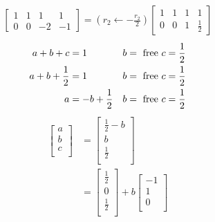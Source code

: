 \documentclass[
	date={August 26{,} 2024}
]{math486notes}
\begin{document}
\begin{example}
\begin{equation*}
	\end{equation*}
	\begin{equation*}
	\begin{aligned}
		\left[ \begin{array}{rrr|r}
			1 & 1 & 1 & 1\\
			0 & 0 & -2 & -1
		\end{array} \right] = \left( r_{2} \gets -\frac{r_{2}}{2} \right)
		\left[ \begin{array}{rrr|r}
			1 & 1 & 1 & 1\\
			0 & 0 & 1 & \frac{1}{2}
		\end{array} \right]
	\end{aligned}
	\end{equation*}
	\begin{equation*}
	\begin{aligned}
		a + b + c &= 1 { }{ } & { }{ } b = \mbox{ free } { }{ } & { }{ } c = \frac{1}{2}\\
		a + b + \frac{1}{2} &= 1 { }{ } & { }{ } b = \mbox{ free } { }{ } & { }{ } c = \frac{1}{2}\\
		a &= -b + \frac{1}{2} { }{ } & { }{ } b = \mbox{ free } { }{ } & { }{ } c = \frac{1}{2}\\
	\end{aligned}
	\end{equation*}\begin{equation*}
	\begin{aligned}
		\left[ \begin{array}{c}
			a\\
			b\\
			c\\
		\end{array} \right]
		&= \left[ \begin{array}{c}
			\frac{1}{2} - b\\
			b\\
			\frac{1}{2}\\
		\end{array} \right]\\
		&= \left[ \begin{array}{c}
			\frac{1}{2}\\
			0\\
			\frac{1}{2}\\
		\end{array} \right]
		+ b\left[ \begin{array}{c}
			-1\\
			1\\
			0\\
		\end{array} \right]\\

\end{aligned}
\end{equation*}
\end{example}
\end{document}
